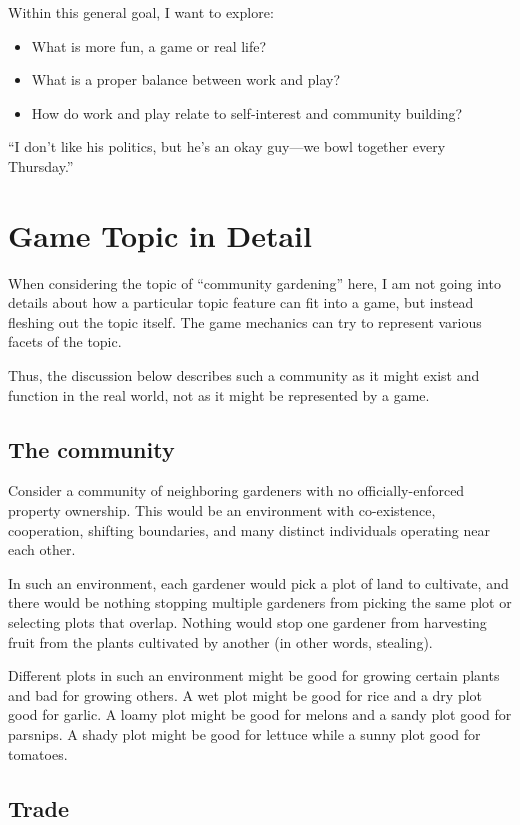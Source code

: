 \documentclass[12pt]{article}
\begin{document}
Within this general goal, I want to explore:
\begin{itemize}
\item What is more fun, a game or real life?
\item What is a proper balance between work and play?
\item How do work and play relate to self-interest and community building?
\end{itemize}

``I don't like his politics, but he's an okay guy---we bowl together every Thursday.''


\section{Game Topic in Detail}

When considering the topic of ``community gardening'' here, I am not going into details about how a particular topic feature can fit into a game, but instead fleshing out the topic itself.
The game mechanics can try to represent various facets of the topic.

Thus, the discussion below describes such a community as it might exist and function in the real world, not as it might be represented by a game. 

\subsection{The community}
Consider a community of neighboring gardeners with no officially-enforced property ownership.
This would be an environment with co-existence, cooperation, shifting boundaries, and many distinct individuals operating near each other.

In such an environment, each gardener would pick a plot of land to cultivate, and there would be nothing stopping multiple gardeners from picking the same plot or selecting plots that overlap.
Nothing would stop one gardener from harvesting fruit from the plants cultivated by another (in other words, stealing).

Different plots in such an environment might be good for growing certain plants and bad for growing others.
A wet plot might be good for rice and a dry plot good for garlic.
A loamy plot might be good for melons and a sandy plot good for parsnips.
A shady plot might be good for lettuce while a sunny plot good for tomatoes.

\subsection{Trade}
\end{document}
